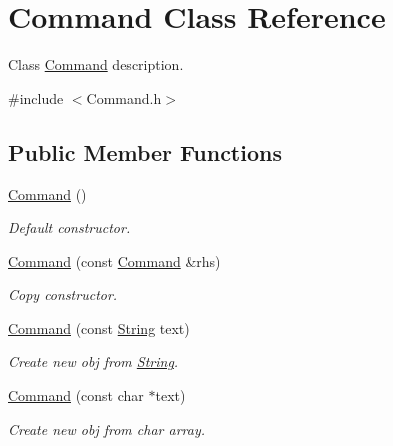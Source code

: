 \hypertarget{class_command}{}\section{Command Class Reference}
\label{class_command}


Class \hyperlink{class_command}{Command} description.  




{\ttfamily \#include $<$Command.\+h$>$}

\subsection*{Public Member Functions}
\begin{DoxyCompactItemize}
\item 
\mbox{\label{class_command_a18df2d81039392daeb0b78c346a70537}} 
\hyperlink{class_command_a18df2d81039392daeb0b78c346a70537}{Command} ()
\begin{DoxyCompactList}\small\item\em Default constructor. \end{DoxyCompactList}\item 
\mbox{\label{class_command_a28004856f059802e3016c780c80e5181}} 
\hyperlink{class_command_a28004856f059802e3016c780c80e5181}{Command} (const \hyperlink{class_command}{Command} \&rhs)
\begin{DoxyCompactList}\small\item\em Copy constructor. \end{DoxyCompactList}\item 
\mbox{\label{class_command_a7a1d6c31ddfc1ab65453a93de293be4e}} 
\hyperlink{class_command_a7a1d6c31ddfc1ab65453a93de293be4e}{Command} (const \hyperlink{class_string}{String} text)
\begin{DoxyCompactList}\small\item\em Create new obj from \hyperlink{class_string}{String}. \end{DoxyCompactList}\item 
\mbox{\label{class_command_a7d6b48fcb77bbbc99d7661cce384d8dc}} 
\hyperlink{class_command_a7d6b48fcb77bbbc99d7661cce384d8dc}{Command} (const char $\ast$text)
\begin{DoxyCompactList}\small\item\em Create new obj from char array. \end{DoxyCompactList}\item 

\end{DoxyCompactItemize}
